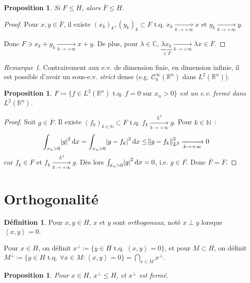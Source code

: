 \documentclass{report}
\newcommand{\C}{{\mathbb C}}
\newcommand{\R}{{\mathbb R}}
\newcommand{\N}{{\mathbb N}}
\newcommand{\scpr}[2]{\left\langle#1, #2\right\rangle}
\newcommand{\tq}{\text{ t.q. }}
\newcommand{\pinfty}{{+\infty}}
\newcommand{\dx}{\dif x}
\newtheorem{prp}[thm]{Proposition}
\theoremstyle{definition}
\newtheorem{déf}[thm]{Définition}
\theoremstyle{remark}
\newtheorem*{rmq}{Remarque}
\begin{document}
\begin{prp} Si $F \leq H$, alors $\overline F \leq H$.
\end{prp}

\begin{proof} Pour $x, y \in \overline F$, il existe $(x_k)_k, (y_k)_k \subset F \tq x_k \xrightarrow[k \to \pinfty]{} x$ et $y_k \xrightarrow[k \to \pinfty]{} y$.

Donc $F \ni x_k+y_k \xrightarrow[k \to \pinfty]{} x+y$.
De plus, pour $\lambda \in \C$, $\underbrace {\lambda x_k}_{\in F} \xrightarrow[k \to \pinfty]{} \lambda x \in \overline F$.
\end{proof}

\begin{rmq} Contrairement aux e.v. de dimension finie, en dimension infinie, il est possible d'avoir un sous-e.v. \textit{strict} dense (e.g. $\mathcal C^\infty_0(\R^n)$ dans $L^2(\R^n)$).
\end{rmq}

\begin{prp} $F \coloneqq \{f \in L^2(\R^n) \tq f=0 \text{ sur } x_n > 0\}$ est un e.v. fermé dans $L^2(\R^n)$.
\end{prp}

\begin{proof} Soit $g \in \overline F$. Il existe $(f_k)_{k \in \N} \subset F \tq f_k \xrightarrow[k \to \pinfty]{L^2} g$. Pour $k \in \N$~:
\[\int_{x_n > 0}\abs g^2\dx = \int_{x_n > 0}\abs {g-f_k}^2\dx \leq \norm {g-f_k}^2_{L^2} \xrightarrow[k \to \pinfty]{} 0\]
car $f_k \in F$ et $f_k \xrightarrow[k \to \pinfty]{L^2} g$. Dès lors $\int_{x_n > 0}\abs g^2\dx = 0$, i.e. $g \in F$. Donc $\overline F = F$.
\end{proof}

\section{Orthogonalité}

\begin{déf} Pour $x, y \in H$, $x$ et $y$ sont \textit{orthogonaux}, noté $x \perp y$ lorsque $\scpr xy = 0$.

Pour $x \in H$, on définit $x^\perp \coloneqq \{y \in H \tq \scpr xy = 0\}$, et pour $M \subset H$, on définit
$M^\perp \coloneqq \{y \in H \tq \forall x \in M : \scpr xy = 0\} = \bigcap_{x \in M}x^\perp$.
\end{déf}

\begin{prp} Pour $x \in H$, $x^\perp \leq H$, et $x^\perp$ est fermé.
\end{prp}
\end{document}
